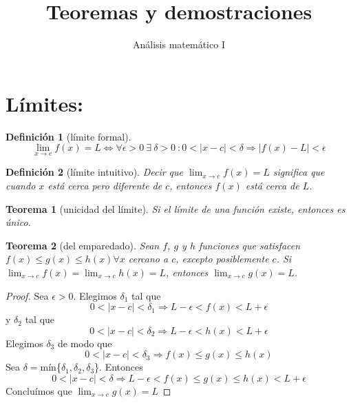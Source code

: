 \documentclass{report}
\title{Teoremas y demostraciones}
\date{}
\author{Análisis matemático I}
\newtheorem*{theorem}{Teorema}
\newtheorem*{definition}{Definición}
\begin{document}
  \maketitle
  \listoftheorems
  \chapter*{Límites:} 
    \begin{definition}[límite formal]
      \begin{equation*}
        \lim_{x\to c}f(x)=L\iff\forall\epsilon>0 \ \exists\ \delta>0\ :0<|x-c|<\delta\Longrightarrow
        |f(x)-L|<\epsilon 
      \end{equation*}
    \end{definition}
    \begin{definition}[límite intuitivo]
      Decir que $\lim_{x\to c}f(x)=L$ significa  que cuando $x$ está cerca pero diferente de $c$,
      entonces $f(x)$ está cerca de $L$.
    \end{definition}
    \begin{theorem}[unicidad del límite]
      Si el límite de una función existe, entonces es único.
    \end{theorem}
    \begin{theorem}[del emparedado]
      Sean $f$, $g$ y $h$ funciones que satisfacen $f(x)\leqslant g(x)\leqslant h(x)\forall x$
      cercano a $c$, excepto posiblemente $c$. Si $\lim_{x\to c}f(x)=\lim_{x\to c}h(x)=L$, entonces
      $\lim_{x\to c}g(x)=L$.
    \end{theorem}
    \begin{proof}
      Sea $\epsilon>0$. Elegimos $\delta_1$ tal que
      \begin{equation*}
        0<|x-c|<\delta_1\Longrightarrow L-\epsilon<f(x)<L+\epsilon
      \end{equation*}
      y $\delta_2$ tal que
      \begin{equation*}
        0<|x-c|<\delta_2\Longrightarrow L-\epsilon<h(x)<L+\epsilon
      \end{equation*}
      Elegimos $\delta_3$ de modo que
      \begin{equation*}
        0<|x-c|<\delta_3\Longrightarrow f(x)\leqslant g(x)\leqslant h(x)
      \end{equation*}
      Sea $\delta=$mín\{$\delta_1,\delta_2,\delta_3$\}. Entonces
      \begin{equation*}
        0<|x-c|<\delta\Longrightarrow L-\epsilon<f(x)\leqslant g(x)\leqslant h(x)<L+\epsilon
      \end{equation*}
      Concluímos que $\lim_{x\to c}g(x)=L$
    \end{proof}
\end{document}
